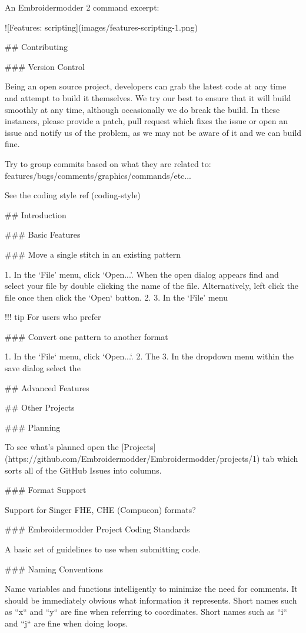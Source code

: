 An Embroidermodder 2 command excerpt:

![Features: scripting](images/features-scripting-1.png)

## Contributing

### Version Control

Being an open source project, developers can grab the latest code at any time
and attempt to build it themselves. We try our best to ensure that it will build smoothly
at any time, although occasionally we do break the build. In these instances,
please provide a patch, pull request which fixes the issue or open an issue and
notify us of the problem, as we may not be aware of it and we can build fine.

Try to group commits based on what they are related to: features/bugs/comments/graphics/commands/etc...

See the coding style ref (coding-style)

## Introduction

### Basic Features

### Move a single stitch in an existing pattern

1. In the `File' menu, click `Open...'. When the open dialog appears find and select your file by double clicking the name of the file. Alternatively, left click the file once then click the `Open` button.
2.
3. In the `File' menu

!!! tip
    For users who prefer

### Convert one pattern to another format

1. In the `File` menu, click `Open...`.
2. The 
3. In the dropdown menu within the save dialog select the 

## Advanced Features

## Other Projects

### Planning

To see what's planned open the [Projects](https://github.com/Embroidermodder/Embroidermodder/projects/1) tab which sorts all of the GitHub Issues into columns.

### Format Support

Support for Singer FHE, CHE (Compucon) formats?

### Embroidermodder Project Coding Standards

A basic set of guidelines to use when submitting code.

### Naming Conventions

Name variables and functions intelligently to minimize the need for comments.
It should be immediately obvious what information it represents.
Short names such as ``x`` and ``y`` are fine when referring to coordinates.
Short names such as ``i`` and ``j`` are fine when doing loops.

